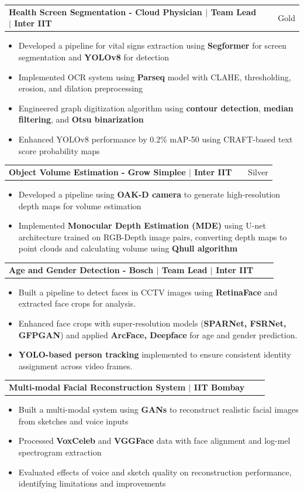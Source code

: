 \documentclass[a4paper,10pt]{article}
\makeatletter
\newenvironment{joblong}[2]
    {
    \begin{tabularx}{\linewidth}{@{}l X r@{}}
    \textbf{#1} & \hfill &  #2 \\[3.75pt]
    \end{tabularx}
    \begin{minipage}[t]{\linewidth}
    \begin{itemize}[nosep,after=\strut, leftmargin=1em, itemsep=3pt,label=--]
    }
    {
    \end{itemize}
    \end{minipage}
    }
\makeatother
\begin{document}
\newpage

\begin{joblong}{{\color{adobeblue}Health Screen Segmentation - Cloud Physician} $|$ Team Lead $|$ Inter IIT}{Gold}
\item Developed a pipeline for vital signs extraction using \textbf{Segformer} for screen segmentation and \textbf{YOLOv8} for detection
\item Implemented OCR system using \textbf{Parseq} model with CLAHE, thresholding, erosion, and dilation preprocessing
\item Engineered graph digitization algorithm using \textbf{contour detection}, \textbf{median filtering}, and \textbf{Otsu binarization}
\item Enhanced YOLOv8 performance by 0.2\% mAP-50 using CRAFT-based text score probability maps
\end{joblong}

\begin{joblong}{{\color{adobeblue}Object Volume Estimation - Grow Simplee} $|$ Inter IIT}{Silver}
\item Developed a pipeline using \textbf{OAK-D camera} to generate high-resolution depth maps for volume estimation
\item Implemented \textbf{Monocular Depth Estimation (MDE)} using U-net architecture trained on RGB-Depth image pairs, converting depth maps to point clouds and calculating volume using \textbf{Qhull algorithm}
\end{joblong}

\begin{joblong}{{\color{adobeblue}Age and Gender Detection - Bosch} $|$ Team Lead $|$ Inter IIT}{}
\item Built a pipeline to detect faces in CCTV images using \textbf{RetinaFace} and extracted face crops for analysis.
\item Enhanced face crops with super-resolution models (\textbf{SPARNet, FSRNet, GFPGAN}) and applied \textbf{ArcFace, Deepface} for age and gender prediction.
\item  \textbf{YOLO-based person tracking} implemented to ensure consistent identity assignment across video frames.
\end{joblong}

\begin{joblong}{{\color{adobeblue}Multi-modal Facial Reconstruction System} $|$ IIT Bombay}{}
\item Built a multi-modal system using \textbf{GANs} to reconstruct realistic facial images from sketches and voice inputs
\item Processed \textbf{VoxCeleb} and \textbf{VGGFace} data with face alignment and log-mel spectrogram extraction
\item Evaluated effects of voice and sketch quality on reconstruction performance, identifying limitations and improvements
\end{joblong}
\end{document}
